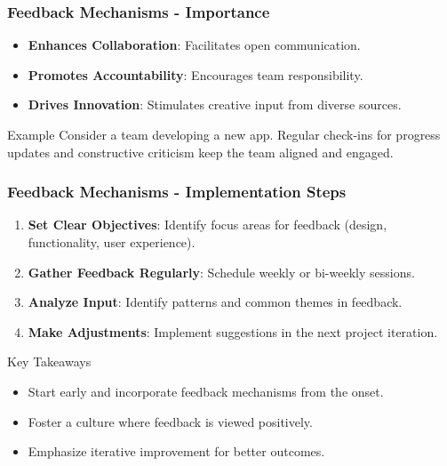 \documentclass[aspectratio=169]{beamer}
\begin{document}
\begin{frame}[fragile]
    \frametitle{Feedback Mechanisms - Importance}
    
    \begin{itemize}
        \item \textbf{Enhances Collaboration}: Facilitates open communication.
        \item \textbf{Promotes Accountability}: Encourages team responsibility.
        \item \textbf{Drives Innovation}: Stimulates creative input from diverse sources.
    \end{itemize}
    
    \begin{block}{Example}
        Consider a team developing a new app. Regular check-ins for progress updates and constructive criticism keep the team aligned and engaged.
    \end{block}
\end{frame}

\begin{frame}[fragile]
    \frametitle{Feedback Mechanisms - Implementation Steps}
    
    \begin{enumerate}
        \item \textbf{Set Clear Objectives}: Identify focus areas for feedback (design, functionality, user experience).
        \item \textbf{Gather Feedback Regularly}: Schedule weekly or bi-weekly sessions.
        \item \textbf{Analyze Input}: Identify patterns and common themes in feedback.
        \item \textbf{Make Adjustments}: Implement suggestions in the next project iteration.
    \end{enumerate}

    \begin{block}{Key Takeaways}
        \begin{itemize}
            \item Start early and incorporate feedback mechanisms from the onset.
            \item Foster a culture where feedback is viewed positively.
            \item Emphasize iterative improvement for better outcomes.
        \end{itemize}
    \end{block}
\end{frame}
\end{document}
